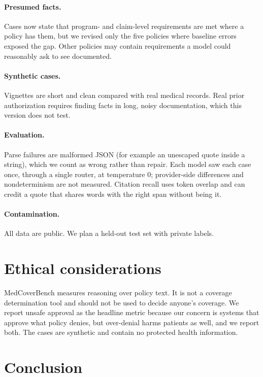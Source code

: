 \documentclass[11pt]{article}
\begin{document}
\paragraph{Presumed facts.} Cases now state that program- and claim-level requirements are met
where a policy has them, but we revised only the five policies where baseline errors exposed the
gap. Other policies may contain requirements a model could reasonably ask to see documented.

\paragraph{Synthetic cases.} Vignettes are short and clean compared with real medical records.
Real prior authorization requires finding facts in long, noisy documentation, which this version
does not test.

\paragraph{Evaluation.} Parse failures are malformed JSON (for example an unescaped quote inside
a string), which we count as wrong rather than repair. Each model saw each case once, through a single router, at temperature 0;
provider-side differences and nondeterminism are not measured. Citation recall uses token overlap
and can credit a quote that shares words with the right span without being it.

\paragraph{Contamination.} All data are public. We plan a held-out test set with private labels.

\section{Ethical considerations}

MedCoverBench measures reasoning over policy text. It is not a coverage determination tool and
should not be used to decide anyone's coverage. We report unsafe approval as the headline metric
because our concern is systems that approve what policy denies, but over-denial harms patients as
well, and we report both. The cases are synthetic and contain no protected health information.

\section{Conclusion}
\end{document}
